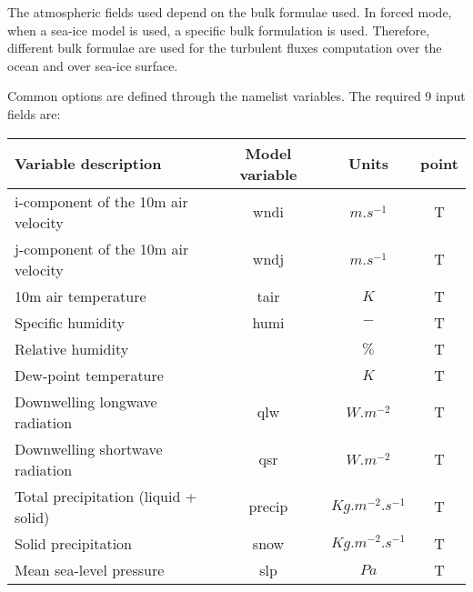 \documentclass[../main/NEMO_manual]{subfiles}
\begin{document}
The atmospheric fields used depend on the bulk formulae used.  In forced mode,
when a sea-ice model is used, a specific bulk formulation is used.  Therefore,
different bulk formulae are used for the turbulent fluxes computation over the
ocean and over sea-ice surface.


Common options are defined through the  namelist variables.
The required 9 input fields are:

\begin{table}[htbp]
  \centering
  \begin{tabular}{|l|c|c|c|}
    \hline
    Variable description                 & Model variable & Units              & point \\
    \hline
    i-component of the 10m air velocity  & wndi           & $m.s^{-1}$         & T     \\
    \hline
    j-component of the 10m air velocity  & wndj           & $m.s^{-1}$         & T     \\
    \hline
    10m air temperature                  & tair           & $K$               & T     \\
    \hline
    Specific humidity                    & humi           & $-$               & T     \\
    Relative humidity                    & ~              & $\%$              & T     \\
    Dew-point temperature                & ~              & $K$               & T     \\    
    \hline
    Downwelling longwave radiation       & qlw            & $W.m^{-2}$         & T     \\
    \hline
    Downwelling shortwave radiation      & qsr            & $W.m^{-2}$         & T     \\
    \hline
    Total precipitation (liquid + solid) & precip         & $Kg.m^{-2}.s^{-1}$ & T     \\
    \hline
    Solid precipitation                  & snow           & $Kg.m^{-2}.s^{-1}$ & T     \\
    \hline
    Mean sea-level pressure              & slp            & $Pa$              & T     \\
    \hline
    \end{tabular}
  \label{tab:SBC_BULK}
\end{table}
\end{document}
